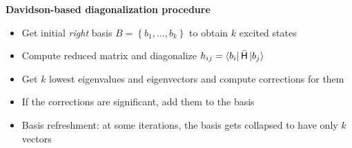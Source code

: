 \textbf{Davidson-based diagonalization procedure}
\begin{itemize}

  \item
    Get initial \textit{right} basis
    $ B = \left \{ b_{1}, \ldots, b_{k} \right \} $
    to obtain $ k $ excited states

  \item
    Compute reduced matrix and diagonalize
    $
      h_{ij} =
      \left< b_{i} \right| \bar{\mathsf{H}} \left| b_{j} \right>
    $

  \item
    Get $ k $ lowest eigenvalues and eigenvectors and compute corrections
    for them

  \item
    If the corrections are significant, add them to the basis

  \item
    Basis refreshment: at some iterations, the basis gets collapsed
    to have only $ k $ vectors

\end{itemize}
